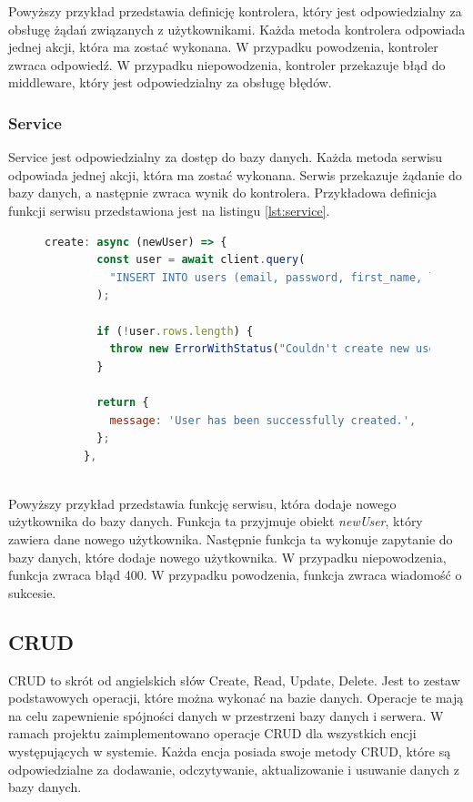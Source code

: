 Powyższy przykład przedstawia definicję kontrolera, który jest odpowiedzialny za obsługę żądań związanych z użytkownikami. Każda metoda kontrolera odpowiada jednej akcji, która ma zostać wykonana. W przypadku powodzenia, kontroler zwraca odpowiedź. W przypadku niepowodzenia, kontroler przekazuje błąd do middleware, który jest odpowiedzialny za obsługę błędów.

\subsubsection{Service}
Service jest odpowiedzialny za dostęp do bazy danych. Każda metoda serwisu odpowiada jednej akcji, która ma zostać wykonana. Serwis przekazuje żądanie do bazy danych, a następnie zwraca wynik do kontrolera. Przykładowa definicja funkcji serwisu przedstawiona jest na listingu \ref{lst:service}.

\begin{figure}[H]
\begin{lstlisting}[language=JavaScript, caption=Przykładowa definicja serwisu, label=lst:service]
    create: async (newUser) => {
        const user = await client.query(
          "INSERT INTO users (email, password, first_name, last_name) VALUES ("${newUser.email}", "${newUser.password}", "${newUser.name}", "${newUser.last_name}") returning *;"
        );
    
        if (!user.rows.length) {
          throw new ErrorWithStatus("Couldn't create new user with given data:\n${newUser}", 400);
        }
    
        return {
          message: 'User has been successfully created.',
        };
      },
    
\end{lstlisting}
\end{figure}

Powyższy przykład przedstawia funkcję serwisu, która dodaje nowego użytkownika do bazy danych. Funkcja ta przyjmuje obiekt \textit{newUser}, który zawiera dane nowego użytkownika. Następnie funkcja ta wykonuje zapytanie do bazy danych, które dodaje nowego użytkownika. W przypadku niepowodzenia, funkcja zwraca błąd 400. W przypadku powodzenia, funkcja zwraca wiadomość o sukcesie.


\subsection{CRUD}
CRUD to skrót od angielskich słów Create, Read, Update, Delete. Jest to zestaw podstawowych operacji, które można wykonać na bazie danych. Operacje te mają na celu zapewnienie spójności danych w przestrzeni bazy danych i serwera. W ramach projektu zaimplementowano operacje CRUD dla wszystkich encji występujących w systemie. Każda encja posiada swoje metody CRUD, które są odpowiedzialne za dodawanie, odczytywanie, aktualizowanie i usuwanie danych z bazy danych. 

